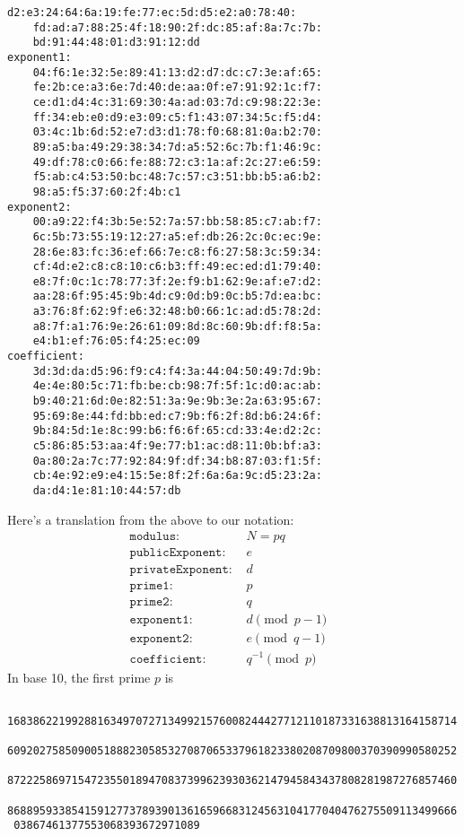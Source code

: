 {\begin{Verbatim}[frame=single]
    d2:e3:24:64:6a:19:fe:77:ec:5d:d5:e2:a0:78:40:
    fd:ad:a7:88:25:4f:18:90:2f:dc:85:af:8a:7c:7b:
    bd:91:44:48:01:d3:91:12:dd
exponent1:
    04:f6:1e:32:5e:89:41:13:d2:d7:dc:c7:3e:af:65:
    fe:2b:ce:a3:6e:7d:40:de:aa:0f:e7:91:92:1c:f7:
    ce:d1:d4:4c:31:69:30:4a:ad:03:7d:c9:98:22:3e:
    ff:34:eb:e0:d9:e3:09:c5:f1:43:07:34:5c:f5:d4:
    03:4c:1b:6d:52:e7:d3:d1:78:f0:68:81:0a:b2:70:
    89:a5:ba:49:29:38:34:7d:a5:52:6c:7b:f1:46:9c:
    49:df:78:c0:66:fe:88:72:c3:1a:af:2c:27:e6:59:
    f5:ab:c4:53:50:bc:48:7c:57:c3:51:bb:b5:a6:b2:
    98:a5:f5:37:60:2f:4b:c1
exponent2:
    00:a9:22:f4:3b:5e:52:7a:57:bb:58:85:c7:ab:f7:
    6c:5b:73:55:19:12:27:a5:ef:db:26:2c:0c:ec:9e:
    28:6e:83:fc:36:ef:66:7e:c8:f6:27:58:3c:59:34:
    cf:4d:e2:c8:c8:10:c6:b3:ff:49:ec:ed:d1:79:40:
    e8:7f:0c:1c:78:77:3f:2e:f9:b1:62:9e:af:e7:d2:
    aa:28:6f:95:45:9b:4d:c9:0d:b9:0c:b5:7d:ea:bc:
    a3:76:8f:62:9f:e6:32:48:b0:66:1c:ad:d5:78:2d:
    a8:7f:a1:76:9e:26:61:09:8d:8c:60:9b:df:f8:5a:
    e4:b1:ef:76:05:f4:25:ec:09
coefficient:
    3d:3d:da:d5:96:f9:c4:f4:3a:44:04:50:49:7d:9b:
    4e:4e:80:5c:71:fb:be:cb:98:7f:5f:1c:d0:ac:ab:
    b9:40:21:6d:0e:82:51:3a:9e:9b:3e:2a:63:95:67:
    95:69:8e:44:fd:bb:ed:c7:9b:f6:2f:8d:b6:24:6f:
    9b:84:5d:1e:8c:99:b6:f6:6f:65:cd:33:4e:d2:2c:
    c5:86:85:53:aa:4f:9e:77:b1:ac:d8:11:0b:bf:a3:
    0a:80:2a:7c:77:92:84:9f:df:34:b8:87:03:f1:5f:
    cb:4e:92:e9:e4:15:5e:8f:2f:6a:6a:9c:d5:23:2a:
    da:d4:1e:81:10:44:57:db
\end{Verbatim}
}
Here's a translation from the above to our notation:
{\small
\begin{align*}
\texttt{modulus: } & N = pq               \\     
\texttt{publicExponent: } & e             \\
\texttt{privateExponent: } & d            \\
\texttt{prime1: } & p                     \\
\texttt{prime2: } & q                     \\
\texttt{exponent1: } & d \pmod{p - 1} &   \\
\texttt{exponent2: } & e \pmod{q - 1} &   \\
\texttt{coefficient: } & q^{-1} \pmod{p}  
\end{align*}
}
In base 10, the first prime $p$ is
{\scriptsize
\begin{Verbatim}
 1683862219928816349707271349921576008244427712110187331638813164158714
 6092027585090051888230585327087065337961823380208709800370390990580252
 8722258697154723550189470837399623930362147945843437808281987276857460
 8688959338541591277378939013616596683124563104177040476275509113499666
 03867461377553068393672971089
\end{Verbatim}
}
